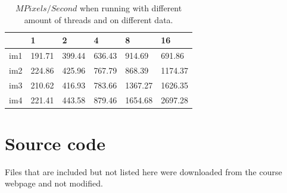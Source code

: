 \documentclass[a4paper,11pt]{article}
\begin{document}
\begin{table}[h!]
  \caption{$MPixels/Second$ when running with different amount of threads and on different data.}
  \label{mpixelspersecond2}
  \begin{tabular}[h]{|l|l|l|l|l|l|}
    \hline
                  & 1     & 2     & 4        & 8       & 16\\
    \hline
    im1           & 191.71 & 399.44 & 636.43 & 914.69  & 691.86\\ 
    im2           & 224.86 & 425.96 & 767.79 & 868.39  & 1174.37\\ 
    im3           & 210.62 & 416.93 & 783.66 & 1367.27 & 1626.35\\ 
    im4           & 221.41 & 443.58 & 879.46 & 1654.68 & 2697.28\\
    \hline
  \end{tabular}
\end{table}

\clearpage
\section{Source code}
Files that are included but not listed here were downloaded from the course webpage and not modified.


\clearpage

\clearpage

\clearpage



\end{document}
